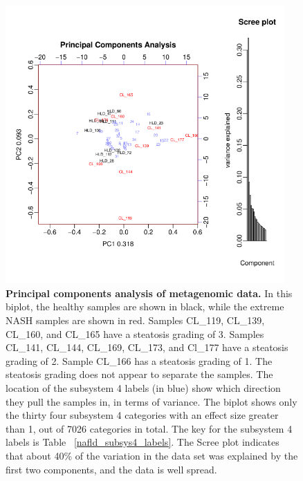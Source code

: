 \begin{figure}[h]
\begin{center}
\includegraphics[width=0.95\textwidth]{metagenomic_pca.png}
\caption[Principal components analysis of metagenomic data.]{\textbf{Principal components analysis of metagenomic data.} In this biplot, the healthy samples are shown in black, while the extreme NASH samples are shown in red. Samples CL\_119, CL\_139, CL\_160, and CL\_165 have a steatosis grading of 3. Samples CL\_141, CL\_144, CL\_169, CL\_173, and Cl\_177 have a steatosis grading of 2. Sample CL\_166 has a steatosis grading of 1. The steatosis grading does not appear to separate the samples. The location of the subsystem 4 labels (in blue) show which direction they pull the samples in, in terms of variance. The biplot shows only the thirty four subsystem 4 categories with an effect size greater than 1, out of 7026 categories in total. The key for the subsystem 4 labels is Table ~\ref{nafld_subsys4_labels}. The Scree plot indicates that about 40\% of the variation in the data set was explained by the first two components, and the data is well spread.}
\label{nafld_metagenomic_pca}
\end{center}
\end{figure}

